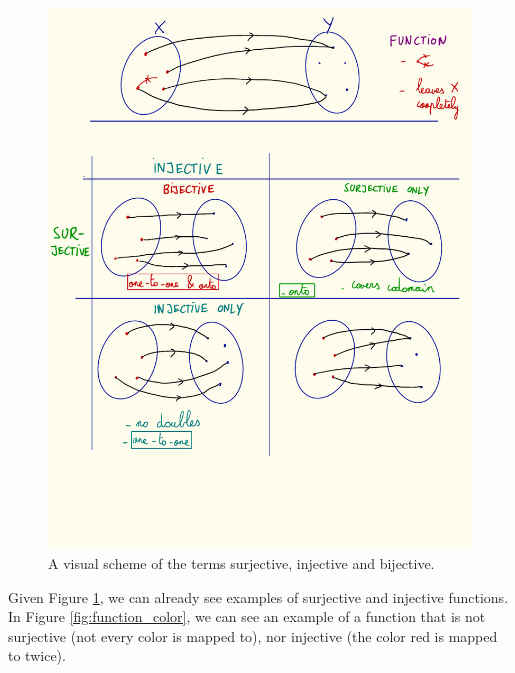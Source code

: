     \begin{figure}[H] \centering
        \includegraphics{images/sur_in_bi}
        \caption{A visual scheme of the terms surjective, injective and bijective.}
        \label{fig:sur_in_bi}
    \end{figure}

    Given Figure \ref{fig:sur_in_bi}, we can already see examples of surjective and injective functions. In Figure \ref{fig:function_color}, we can see an example of a function that is not surjective (not every color is mapped to), nor injective (the color red is mapped to twice). \\
